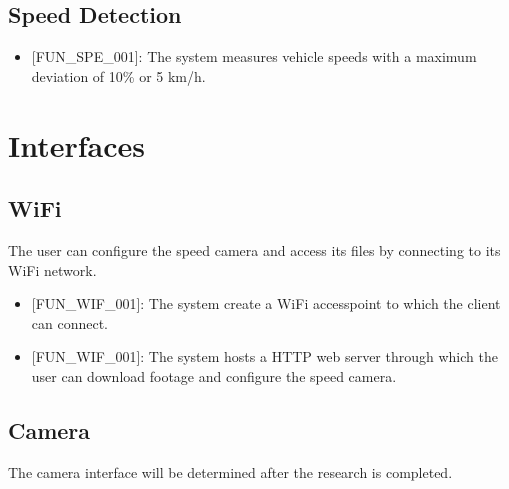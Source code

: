 \subsection{Speed Detection}

\begin{itemize}
    \item {[FUN\_SPE\_001]}: The system measures vehicle speeds with a maximum deviation of 10\% or 5 km/h.
\end{itemize}

\section{Interfaces}

\subsection{WiFi}

The user can configure the speed camera and access its files by connecting to its WiFi network.

\begin{itemize}
    \item {[FUN\_WIF\_001]}: The system create a WiFi accesspoint to which the client can connect.
    \item {[FUN\_WIF\_001]}: The system hosts a HTTP web server through which the user can download footage and configure the speed camera.
\end{itemize}

\subsection{Camera}

The camera interface will be determined after the research is completed.
